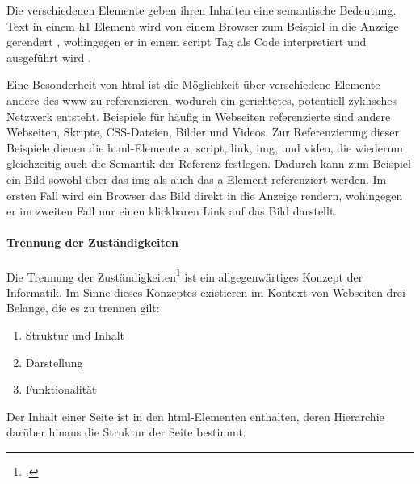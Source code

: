         Die verschiedenen Elemente geben ihren Inhalten eine semantische Bedeutung.
        Text in einem h1 Element wird von einem Browser zum Beispiel in die Anzeige gerendert
        \cite[Kapitel 4.3.6]{w3c:html5},
        wohingegen er in einem script Tag als Code interpretiert und ausgeführt wird
        \cite[Kapitel 4.11.1]{w3c:html5}.
        
        Eine Besonderheit von \gls{html} ist die Möglichkeit
        über verschiedene Elemente andere {\resources} des \gls{www} zu referenzieren,
        wodurch ein gerichtetes, potentiell zyklisches Netzwerk entsteht.
        Beispiele für häufig in Webseiten referenzierte {\resources}
        sind andere Webseiten, Skripte, CSS-Dateien, Bilder und Videos.
        Zur Referenzierung dieser Beispiele dienen die \gls{html}-Elemente
        a, script, link, img, und video,
        die wiederum gleichzeitig auch die Semantik der Referenz festlegen.
        Dadurch kann zum Beispiel ein Bild sowohl über das img
        als auch das a Element referenziert werden.
        Im ersten Fall wird ein Browser das Bild direkt in die Anzeige rendern,
        wohingegen er im zweiten Fall nur einen klickbaren Link auf das Bild darstellt.

        \paragraph*{Trennung der Zuständigkeiten}
        Die Trennung der Zuständigkeiten\footcite[vgl.][]{huersch:SeparationOfConcerns}
        ist ein allgegenwärtiges Konzept der Informatik.
        Im Sinne dieses Konzeptes existieren im Kontext von Webseiten
        drei Belange, die es zu trennen gilt:

        \begin{enumerate}
            \item Struktur und Inhalt
            \item Darstellung
            \item Funktionalität
        \end{enumerate}

        Der Inhalt einer Seite ist in den \gls{html}-Elementen enthalten,
        deren Hierarchie darüber hinaus die Struktur der Seite bestimmt.
        
